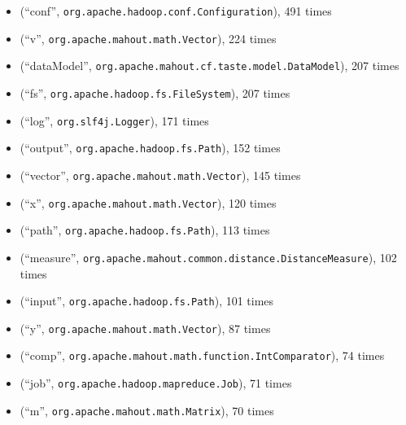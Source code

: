 \begin{itemize}
\item (``conf'', \verb|org.apache.hadoop.conf.Configuration|), 491 times
\item (``v'', \verb|org.apache.mahout.math.Vector|), 224 times
\item (``dataModel'', \verb|org.apache.mahout.cf.taste.model.DataModel|), 207 times
\item (``fs'', \verb|org.apache.hadoop.fs.FileSystem|), 207 times
\item (``log'', \verb|org.slf4j.Logger|), 171 times
\item (``output'', \verb|org.apache.hadoop.fs.Path|), 152 times
\item (``vector'', \verb|org.apache.mahout.math.Vector|), 145 times
\item (``x'', \verb|org.apache.mahout.math.Vector|), 120 times
\item (``path'', \verb|org.apache.hadoop.fs.Path|), 113 times
\item (``measure'', \verb|org.apache.mahout.common.distance.DistanceMeasure|), 102 times
\item (``input'', \verb|org.apache.hadoop.fs.Path|), 101 times
\item (``y'', \verb|org.apache.mahout.math.Vector|), 87 times
\item (``comp'', \verb|org.apache.mahout.math.function.IntComparator|), 74 times
\item (``job'', \verb|org.apache.hadoop.mapreduce.Job|), 71 times
\item (``m'', \verb|org.apache.mahout.math.Matrix|), 70 times
\end{itemize}
